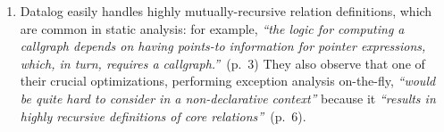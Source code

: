 \begin{enumerate}

\item

  Datalog easily handles highly mutually-recursive relation definitions, which
  are common in static analysis: for example, \emph{``the logic for computing a
    callgraph depends on having points-to information for pointer expressions,
    which, in turn, requires a callgraph.''}~(p.~3) They also observe that one
  of their crucial optimizations, performing exception analysis on-the-fly,
  \emph{``would be quite hard to consider in a non-declarative context''}
  because it \emph{``results in highly recursive definitions of core
    relations''}~(p.~6).


\end{enumerate}
